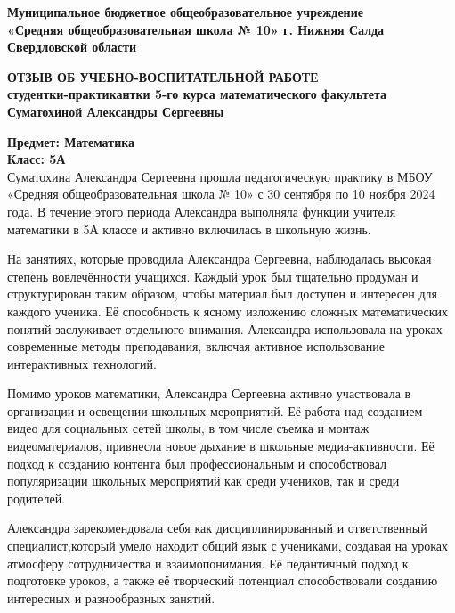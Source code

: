 \documentclass[a4paper,12pt]{article}
\begin{document}
\begin{center}
    \textbf{Муниципальное бюджетное общеобразовательное учреждение}\\
    \textbf{«Средняя общеобразовательная школа № 10» г. Нижняя Салда Свердловской области}\\
    \end{center}
\begin{center}
    \textbf{\large ОТЗЫВ ОБ УЧЕБНО-ВОСПИТАТЕЛЬНОЙ РАБОТЕ}\\
    \textbf{студентки-практикантки 5-го курса математического факультета}\\
    \textbf{Суматохиной Александры Сергеевны}
    \end{center}
\vspace{10mm}


\noindent
\textbf{Предмет: Математика}\\
\textbf{Класс: 5А}\\

Суматохина Александра Сергеевна прошла педагогическую практику в МБОУ «Средняя общеобразовательная школа № 10» с 30 сентября по 10 ноября 2024 года. В течение этого периода Александра выполняла функции учителя математики в 5А классе и активно включилась в школьную жизнь.

На занятиях, которые проводила Александра Сергеевна, наблюдалась высокая степень вовлечённости учащихся. Каждый урок был тщательно продуман и структурирован таким образом, чтобы материал был доступен и интересен для каждого ученика. Её способность к ясному изложению сложных математических понятий заслуживает отдельного внимания. Александра использовала на уроках современные методы преподавания, включая активное использование интерактивных технологий.

Помимо уроков математики, Александра Сергеевна активно участвовала в организации и освещении школьных мероприятий. Её работа над созданием видео для социальных сетей школы, в том числе съемка и монтаж видеоматериалов, привнесла новое дыхание в школьные медиа-активности. Её подход к созданию контента был профессиональным и способствовал популяризации школьных мероприятий как среди учеников, так и среди родителей.

Александра зарекомендовала себя как дисциплинированный и ответственный специалист,который умело находит общий язык с учениками, создавая на уроках атмосферу сотрудничества и взаимопонимания. Её педантичный подход к подготовке уроков, а также её творческий потенциал способствовали созданию интересных и разнообразных занятий.
\end{document}
